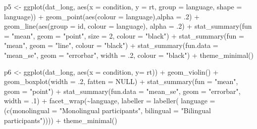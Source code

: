 \documentclass[
  english,
  doc,floatsintext]{apa6}
\newenvironment{Shaded}{\begin{snugshade}}{\end{snugshade}}
\newcommand{\AttributeTok}[1]{\textcolor[rgb]{0.77,0.63,0.00}{#1}}
\newcommand{\ConstantTok}[1]{\textcolor[rgb]{0.00,0.00,0.00}{#1}}
\newcommand{\DecValTok}[1]{\textcolor[rgb]{0.00,0.00,0.81}{#1}}
\newcommand{\FunctionTok}[1]{\textcolor[rgb]{0.00,0.00,0.00}{#1}}
\newcommand{\NormalTok}[1]{#1}
\newcommand{\OtherTok}[1]{\textcolor[rgb]{0.56,0.35,0.01}{#1}}
\newcommand{\SpecialCharTok}[1]{\textcolor[rgb]{0.00,0.00,0.00}{#1}}
\newcommand{\StringTok}[1]{\textcolor[rgb]{0.31,0.60,0.02}{#1}}
\begin{document}
\begin{Shaded}
\begin{Highlighting}[]
\NormalTok{p5 }\OtherTok{\textless{}{-}} \FunctionTok{ggplot}\NormalTok{(dat\_long, }\FunctionTok{aes}\NormalTok{(}\AttributeTok{x =}\NormalTok{ condition, }\AttributeTok{y =}\NormalTok{ rt, }\AttributeTok{group =}\NormalTok{ language, }\AttributeTok{shape =}\NormalTok{ language)) }\SpecialCharTok{+}
  \FunctionTok{geom\_point}\NormalTok{(}\FunctionTok{aes}\NormalTok{(}\AttributeTok{colour =}\NormalTok{ language),}\AttributeTok{alpha =}\NormalTok{ .}\DecValTok{2}\NormalTok{) }\SpecialCharTok{+}
  \FunctionTok{geom\_line}\NormalTok{(}\FunctionTok{aes}\NormalTok{(}\AttributeTok{group =}\NormalTok{ id, }\AttributeTok{colour =}\NormalTok{ language), }\AttributeTok{alpha =}\NormalTok{ .}\DecValTok{2}\NormalTok{) }\SpecialCharTok{+}
  \FunctionTok{stat\_summary}\NormalTok{(}\AttributeTok{fun =} \StringTok{"mean"}\NormalTok{, }\AttributeTok{geom =} \StringTok{"point"}\NormalTok{, }\AttributeTok{size =} \DecValTok{2}\NormalTok{, }\AttributeTok{colour =} \StringTok{"black"}\NormalTok{) }\SpecialCharTok{+}
  \FunctionTok{stat\_summary}\NormalTok{(}\AttributeTok{fun =} \StringTok{"mean"}\NormalTok{, }\AttributeTok{geom =} \StringTok{"line"}\NormalTok{, }\AttributeTok{colour =} \StringTok{"black"}\NormalTok{) }\SpecialCharTok{+}
  \FunctionTok{stat\_summary}\NormalTok{(}\AttributeTok{fun.data =} \StringTok{"mean\_se"}\NormalTok{, }\AttributeTok{geom =} \StringTok{"errorbar"}\NormalTok{, }\AttributeTok{width =}\NormalTok{ .}\DecValTok{2}\NormalTok{, }\AttributeTok{colour =} \StringTok{"black"}\NormalTok{) }\SpecialCharTok{+}
  \FunctionTok{theme\_minimal}\NormalTok{()}

\NormalTok{p6 }\OtherTok{\textless{}{-}} \FunctionTok{ggplot}\NormalTok{(dat\_long, }\FunctionTok{aes}\NormalTok{(}\AttributeTok{x =}\NormalTok{ condition, }\AttributeTok{y=}\NormalTok{ rt)) }\SpecialCharTok{+}
  \FunctionTok{geom\_violin}\NormalTok{() }\SpecialCharTok{+}
  \FunctionTok{geom\_boxplot}\NormalTok{(}\AttributeTok{width =}\NormalTok{ .}\DecValTok{2}\NormalTok{, }\AttributeTok{fatten =} \ConstantTok{NULL}\NormalTok{) }\SpecialCharTok{+}
  \FunctionTok{stat\_summary}\NormalTok{(}\AttributeTok{fun =} \StringTok{"mean"}\NormalTok{, }\AttributeTok{geom =} \StringTok{"point"}\NormalTok{) }\SpecialCharTok{+}
  \FunctionTok{stat\_summary}\NormalTok{(}\AttributeTok{fun.data =} \StringTok{"mean\_se"}\NormalTok{, }\AttributeTok{geom =} \StringTok{"errorbar"}\NormalTok{, }\AttributeTok{width =}\NormalTok{ .}\DecValTok{1}\NormalTok{) }\SpecialCharTok{+}
  \FunctionTok{facet\_wrap}\NormalTok{(}\SpecialCharTok{\textasciitilde{}}\NormalTok{language, }
             \AttributeTok{labeller =} \FunctionTok{labeller}\NormalTok{(}
               \AttributeTok{language =}\NormalTok{ (}\FunctionTok{c}\NormalTok{(}\AttributeTok{monolingual =} \StringTok{"Monolingual participants"}\NormalTok{, }
                             \AttributeTok{bilingual =} \StringTok{"Bilingual participants"}\NormalTok{)))) }\SpecialCharTok{+}
  \FunctionTok{theme\_minimal}\NormalTok{()}
\end{Highlighting}
\end{Shaded}
\end{document}
